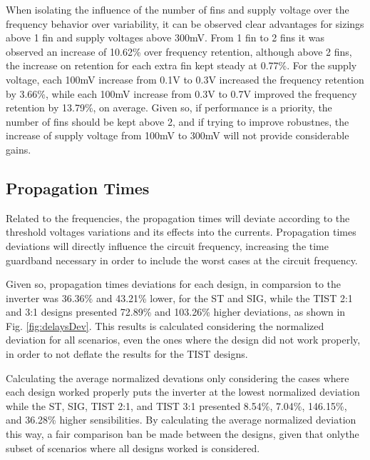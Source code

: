 \documentclass[pgmicro,mestrado,english]{iiufrgs}
\begin{document}
When isolating the influence of the number of fins and supply voltage over the frequency behavior over variability, it can be observed clear advantages for sizings above 1 fin and supply voltages above 300mV. From 1 fin to 2 fins it was observed an increase of 10.62\% over frequency retention, although above 2 fins, the increase on retention for each extra fin kept steady at 0.77\%. For the supply voltage, each 100mV increase from 0.1V to 0.3V increased the frequency retention by 3.66\%, while each 100mV increase from 0.3V to 0.7V improved the frequency retention by 13.79\%, on average. Given so, if performance is a priority, the number of fins should be kept above 2, and if trying to improve robustnes, the increase of supply voltage from 100mV to 300mV will not provide considerable gains. 


\subsection{Propagation Times}

\vspace{-0.5cm}

Related to the frequencies, the propagation times will deviate according to the threshold voltages variations and its effects into the currents. Propagation times deviations will directly influence the circuit frequency, increasing the time guardband necessary in order to include the worst cases at the circuit frequency.

Given so, propagation times deviations for each design, in comparsion to the inverter was 36.36\% and 43.21\% lower, for the ST and SIG, while the TIST 2:1 and 3:1 designs presented 72.89\% and 103.26\% higher deviations, as shown in Fig. \ref{fig:delaysDev}. This results is calculated considering the normalized deviation for all scenarios, even the ones where the design did not work properly, in order to not deflate the results for the TIST designs.

Calculating the average normalized devations only considering the cases where each design worked properly puts the inverter at the lowest normalized deviation while the ST, SIG, TIST 2:1, and TIST 3:1 presented 8.54\%, 7.04\%, 146.15\%, and 36.28\% higher sensibilities. By calculating the average normalized deviation this way, a fair comparison ban be made between the designs, given that onlythe subset of scenarios where all designs worked is considered.
\end{document}
